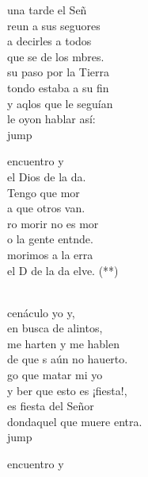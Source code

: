 \begin{cancion}%
	 una tarde el Señ \\
	reun a sus seguores\\
	a decirles a todos\\
	que se  de los mbres.\\
	 su paso por la Tierra\\
	tondo estaba a su fin\\
	y aqlos que le seguían\\
	le oyon hablar así:\\jump\\
	\begin{chorus}%
	 encuentro y\\
	 el Dios de la da.\\
	Tengo que mor\\
	a que otros van.\\
	ro morir no es mor\\
	o la gente entnde.\\
	morimos a la erra\\
	el D de la da elve. (**)\\
	\end{chorus}%
	\jump\\
	 cenáculo yo y,\\
	 en busca de alintos,\\
	 me harten y me hablen\\
	de que s aún no hauerto.\\
	go que matar mi yo\\
	y ber que esto es ¡fiesta!,\\
	es fiesta del Señor\\
	dondaquel que muere entra.\\jump\\
	\begin{chorus}%
	 encuentro y\\

\end{chorus}
\end{cancion}
